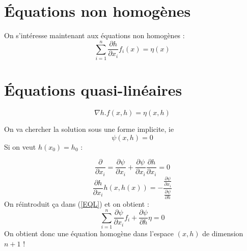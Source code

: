\section{Équations non homogènes}
On s'intéresse maintenant aux équations non homogènes : \begin{equation} \label{ENH}\tag{ENH} \sum_{i=1}^n \frac{\partial h}{\partial x_i} f_i(x)=\eta(x) \end{equation}

\section{Équations quasi-linéaires}
\begin{equation} \tag{EQL} \label{EQL} \nabla h . f(x,h)=\eta(x,h) \end{equation}

On va chercher la solution sous une forme implicite, ie \begin{equation} \tag{Impl} \label{Impl} \psi(x,h)=0\end{equation}
Si on veut $h(x_0)=h_0$ :

\[\frac{\partial}{\partial x_i}=\frac{\partial \psi}{\partial x_i} + \frac{\partial \psi}{\partial x_i} \frac{\partial h}{\partial x_i} = 0\]
\[\frac{\partial h}{\partial x_i} h(x,h(x))= -\frac{\frac{\partial \psi}{\partial x_i}}{\frac{\partial \psi}{\partial h}}\]
On réintroduit ça dans (\ref{EQL}) et on obtient :
\begin{equation} \tag{EHIm} \label{EHIm} \sum_{i=1}^n \frac{\partial \psi}{\partial x_i} f_i + \frac{\partial \psi}{\partial h} \eta = 0 \end{equation}
On obtient donc une équation homogène dans l'espace $(x,h)$ de dimension $n+1$ !
